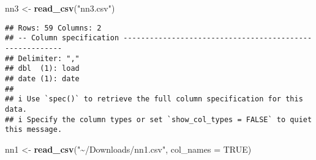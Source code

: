 \documentclass[
]{article}
\newenvironment{Shaded}{\begin{snugshade}}{\end{snugshade}}
\newcommand{\AttributeTok}[1]{\textcolor[rgb]{0.13,0.29,0.53}{#1}}
\newcommand{\CommentTok}[1]{\textcolor[rgb]{0.56,0.35,0.01}{\textit{#1}}}
\newcommand{\ConstantTok}[1]{\textcolor[rgb]{0.56,0.35,0.01}{#1}}
\newcommand{\FunctionTok}[1]{\textcolor[rgb]{0.13,0.29,0.53}{\textbf{#1}}}
\newcommand{\NormalTok}[1]{#1}
\newcommand{\OtherTok}[1]{\textcolor[rgb]{0.56,0.35,0.01}{#1}}
\newcommand{\SpecialCharTok}[1]{\textcolor[rgb]{0.81,0.36,0.00}{\textbf{#1}}}
\newcommand{\StringTok}[1]{\textcolor[rgb]{0.31,0.60,0.02}{#1}}
\begin{document}
\begin{Shaded}
\begin{Highlighting}[]
\NormalTok{nn3 }\OtherTok{\textless{}{-}} \FunctionTok{read\_csv}\NormalTok{(}\StringTok{"nn3.csv"}\NormalTok{) }
\end{Highlighting}
\end{Shaded}

\begin{verbatim}
## Rows: 59 Columns: 2
## -- Column specification --------------------------------------------------------
## Delimiter: ","
## dbl  (1): load
## date (1): date
## 
## i Use `spec()` to retrieve the full column specification for this data.
## i Specify the column types or set `show_col_types = FALSE` to quiet this message.
\end{verbatim}

\begin{Shaded}
\end{Shaded}

\begin{Shaded}
\begin{Highlighting}[]
\NormalTok{nn1 }\OtherTok{\textless{}{-}} \FunctionTok{read\_csv}\NormalTok{(}\StringTok{"\textasciitilde{}/Downloads/nn1.csv"}\NormalTok{, }\AttributeTok{col\_names =} \ConstantTok{TRUE}\NormalTok{)}
\end{Highlighting}
\end{Shaded}
\end{document}
